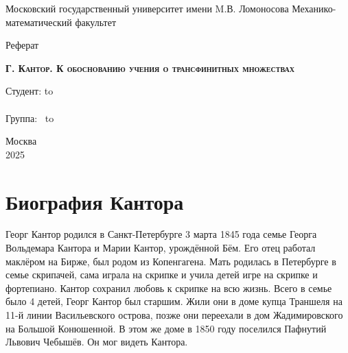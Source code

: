 \documentclass[a4paper,12pt]{extarticle}
\author{Борисенков Никита}
\theoremstyle{definition}
\begin{document}
\begin{titlepage}
    \newpage
    \begin{center}
        Московский государственный университет имени M.В. Ломоносова
        Механико-математический факультет\\
    \end{center}

    \vspace{8em}

    \begin{center}
        \Large Реферат\\
    \end{center}

    \vspace{2em}

    \begin{center}
        \textsc{\textbf{Г. Кантор. К обоснованию учения о трансфинитных множествах}}
    \end{center}

    \vspace{20em}



    \newbox{\lbox}
    \newlength{\maxl}
    \setlength{\maxl}{\wd\lbox}
    \hfill\parbox{13cm}{
        \hspace*{5cm}\hspace*{-5cm}Студент: \qquad\qquad\hbox to \\
        \\
        \hspace*{5cm}\hspace*{-5cm}Группа:\qquad\qquad $\;\:$ \hbox to\\
    }


    \vspace{\fill}

    \begin{center}
        Москва \\2025
    \end{center}

\end{titlepage}
\newpage

\section{Биография Кантора}
Георг Кантор родился в Санкт-Петербурге 3 марта 1845 года семье Георга Вольдемара Кантора и Марии Кантор, урождённой Бём.
Его отец работал маклёром на Бирже, был родом из Копенгагена.
Мать родилась в Петербурге в семье скрипачей, сама играла на скрипке и учила детей игре на скрипке и фортепиано.
Кантор сохранил любовь к скрипке на всю жизнь.
Всего в семье было 4 детей, Георг Кантор был старшим.
Жили они в доме купца Траншеля на 11-й линии Васильевского острова, позже они переехали в дом Жадимировского на Большой Конюшенной.
В этом же доме в 1850 году поселился Пафнутий Львович Чебышёв.
Он мог видеть Кантора.
\end{document}
